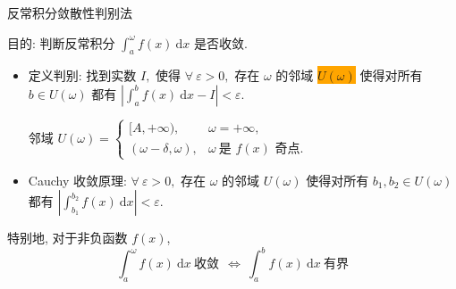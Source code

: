
\begin{frame}{反常积分敛散性判别法}

目的: 判断反常积分 $\int_a^\omega f(x) ~ \mathrm{d} x$ 是否收敛.

\pause
\vspace{1em}

\begin{itemize}
\item 定义判别: 找到实数 $I,$ 使得 $\forall~\varepsilon > 0,$ 存在 $\omega$ 的邻域 \colorbox{orange}{$U(\omega)$} 使得对所有 $b \in U(\omega)$ 都有 $\left\lvert \int_a^b f(x) ~ \mathrm{d} x - I \right\rvert < \varepsilon.$

\pause

邻域 $U(\omega) = \begin{cases}
[A, +\infty), & \omega = +\infty, \\
(\omega - \delta, \omega), & \omega ~ \text{是 $f(x)$ 奇点.}
\end{cases}$
\pause
\item Cauchy 收敛原理: $\forall~\varepsilon > 0,$ 存在 $\omega$ 的邻域 $U(\omega)$ 使得对所有 $b_1, b_2 \in U(\omega)$ 都有 $\left\lvert \int_{b_1}^{b_2} f(x) ~ \mathrm{d} x \right\rvert < \varepsilon.$
\end{itemize}

\pause
\vspace{1em}

特别地, 对于非负函数 $f(x)$,
\[\int_a^\omega f(x) ~ \mathrm{d} x ~ \text{收敛} ~~ \Longleftrightarrow ~ \int_a^b f(x) ~ \mathrm{d} x ~ \text{有界}\]

\end{frame}


